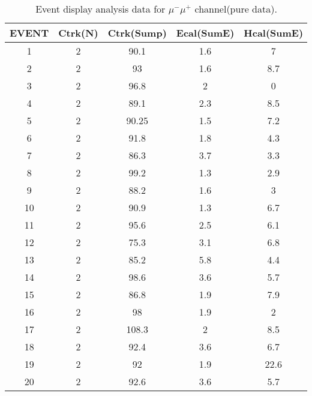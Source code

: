 \begin{table}[h!]
    \centering
    \caption{Event display analysis data for $\mu^-\mu^+$ channel(pure data).}
    \begin{tabular}{ccccc}
    \hline
    EVENT & Ctrk(N) & Ctrk(Sump) & Ecal(SumE) & Hcal(SumE) \\ \hline
    1     & 2       & 90.1       & 1.6        & 7          \\
    2     & 2       & 93         & 1.6        & 8.7        \\
    3     & 2       & 96.8       & 2          & 0          \\
    4     & 2       & 89.1       & 2.3        & 8.5        \\
    5     & 2       & 90.25      & 1.5        & 7.2        \\
    6     & 2       & 91.8       & 1.8        & 4.3        \\
    7     & 2       & 86.3       & 3.7        & 3.3        \\
    8     & 2       & 99.2       & 1.3        & 2.9        \\
    9     & 2       & 88.2       & 1.6        & 3          \\
    10    & 2       & 90.9       & 1.3        & 6.7        \\
    11    & 2       & 95.6       & 2.5        & 6.1        \\
    12    & 2       & 75.3       & 3.1        & 6.8        \\
    13    & 2       & 85.2       & 5.8        & 4.4        \\
    14    & 2       & 98.6       & 3.6        & 5.7        \\
    15    & 2       & 86.8       & 1.9        & 7.9        \\
    16    & 2       & 98         & 1.9        & 2          \\
    17    & 2       & 108.3      & 2          & 8.5        \\
    18    & 2       & 92.4       & 3.6        & 6.7        \\
    19    & 2       & 92         & 1.9        & 22.6       \\
    20    & 2       & 92.6       & 3.6        & 5.7       \\ \hline
    \end{tabular}
    \label{table:ed-mm}
\end{table}
    
